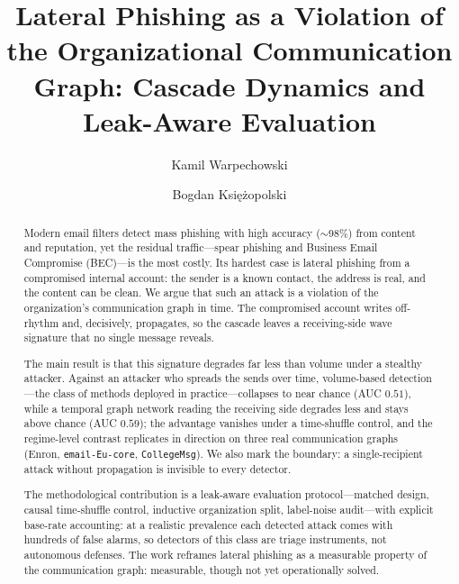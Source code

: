 \documentclass[a4paper,fleqn]{cas-sc}
\begin{document}
\let\WriteBookmarks\relax


\title[mode=title]{Lateral Phishing as a Violation of the Organizational Communication Graph:
Cascade Dynamics and Leak-Aware Evaluation}

\author[1,2]{Kamil Warpechowski}
\cormark[1]


\author[1]{Bogdan Ksi{\k{e}}{\.z}opolski}


\begin{abstract}
Modern email filters detect mass phishing with high accuracy ($\sim$98\%) from content and reputation, yet
the residual traffic---spear phishing and Business Email Compromise (BEC)---is the most costly. Its hardest case
is lateral phishing from a compromised internal account: the sender is a known contact, the address is real,
and the content can be clean. We argue that such an attack is a violation of the organization's communication
graph in time. The compromised account writes off-rhythm and, decisively, propagates, so the cascade leaves a
receiving-side wave signature that no single message reveals.

The main result is that this signature degrades far less than volume under a stealthy attacker. Against an attacker who spreads the
sends over time, volume-based detection---the class of methods deployed in practice---collapses to near
chance (AUC $0.51$), while a temporal graph network reading the receiving side degrades less and
stays above chance (AUC $0.59$); the advantage vanishes under a time-shuffle control, and the regime-level
contrast replicates in direction on three real communication graphs (Enron, \texttt{email-Eu-core},
\texttt{CollegeMsg}). We also mark the boundary: a single-recipient attack without propagation is invisible to
every detector.

The methodological contribution is a leak-aware evaluation protocol---matched design, causal time-shuffle
control, inductive organization split, label-noise audit---with explicit base-rate accounting: at a
realistic prevalence each detected attack comes with hundreds of false alarms, so detectors of this class are
triage instruments, not autonomous defenses. The work reframes lateral phishing as a measurable property of
the communication graph: measurable, though not yet operationally solved.
\end{abstract}
\end{document}
